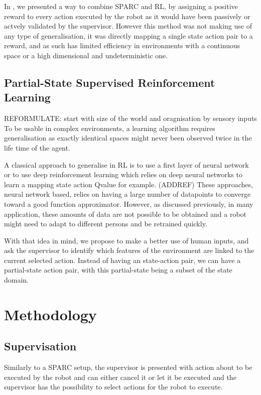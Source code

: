 \documentclass[letterpaper]{article} %
\begin{document}
In \cite{senft2017supervised}, we presented a way to combine SPARC and RL, by
assigning a positive reward to every action executed by the robot as it would
have been passively or actvely validated by the supervisor. However this method
was not making use of any type of generalisation, it was directly mapping a
single state action pair to a reward, and as such has limited efficiency in
environments with a continuous space or a high dimensional and undeterministic
one.

\subsection{Partial-State Supervised Reinforcement Learning}

REFORMULATE: start with size of the world and oragnisation by sensory inputs
To be usable in complex environments, a
learning algorithm requires generalisation as exactly identical spaces might
never been observed twice in the life time of the agent.

A classical approach to generalise in RL is to use a first layer of neural
network or to use deep reinforcement learning which relies on deep neural
networks to learn a mapping state action Qvalue for example. (ADDREF)
These approaches, neural network based, relies on having a large number of
datapoints to converge toward a good function approximator. However, as
discussed previously, in many application, these amounts of data are not
possible to be obtained and a robot might need to adapt to different persons and
be retrained quickly.

With that idea in mind, we propose to make a better use of human inputs, and ask
the supervisor to identify which features of the environment are linked to the
current selected action. Instead of having an state-action pair, we
can have a partial-state action pair, with this partial-state being a subset of
the state domain.

\section{Methodology}

\subsection{Supervisation}
Similarly to a SPARC setup, the supervisor is presented with action about to be
executed by the robot and can either cancel it or let it be executed and the 
supervisor has the possibility to select actions for the robot to execute.
\end{document}
